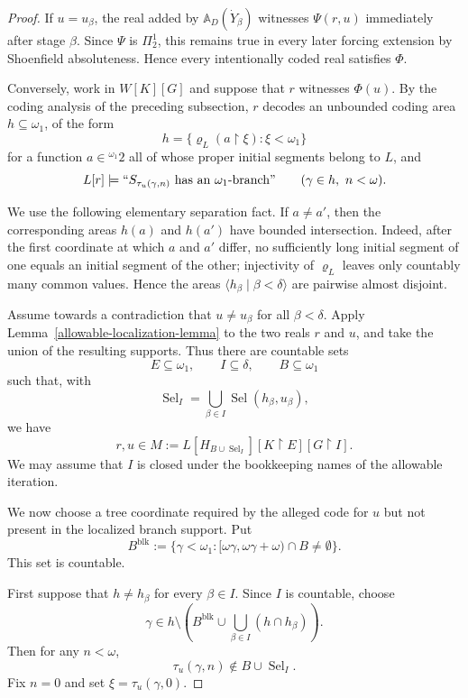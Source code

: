 \documentclass[a4paper,11pt]{article}
\begin{document}
\begin{proof}
If $u=u_\beta$, the real added by $\mathbb A_D(\dot Y_\beta)$ witnesses
$\Psi(r,u)$ immediately after stage $\beta$.  Since $\Psi$ is $\Pi^1_2$, this
remains true in every later forcing extension by Shoenfield absoluteness.
Hence every intentionally coded real satisfies $\Phi$.

Conversely, work in $W[K][G]$ and suppose that $r$ witnesses $\Phi(u)$.  By
the coding analysis of the preceding subsection, $r$ decodes an unbounded
coding area $h\subseteq\omega_1$, of the form
\[
   h=\{\varrho_L(a\restriction\xi):\xi<\omega_1\}
\]
for a function $a\in{}^{\omega_1}2$ all of whose proper initial segments
belong to $L$, and
\[
   L[r]\models
   ``S_{\tau_u(\gamma,n)}\text{ has an }\omega_1\text{-branch}"
   \qquad(\gamma\in h,\ n<\omega).
\]

We use the following elementary separation fact.  If $a\neq a'$, then the
corresponding areas $h(a)$ and $h(a')$ have bounded intersection.  Indeed,
after the first coordinate at which $a$ and $a'$ differ, no sufficiently long
initial segment of one equals an initial segment of the other; injectivity of
$\varrho_L$ leaves only countably many common values.  Hence the areas
$\langle h_\beta\mid\beta<\delta\rangle$ are pairwise almost disjoint.

Assume towards a contradiction that $u\neq u_\beta$ for all $\beta<\delta$.
Apply Lemma~\ref{allowable-localization-lemma} to the two reals $r$ and $u$,
and take the union of the resulting supports.  Thus there are countable sets
\[
   E\subseteq\omega_1,
   \qquad I\subseteq\delta,
   \qquad B\subseteq\omega_1
\]
such that, with
\[
   \operatorname{Sel}_I=
      \bigcup_{\beta\in I}\operatorname{Sel}(h_\beta,u_\beta),
\]
we have
\[
   r,u\in
   M:=L[H_{B\cup\operatorname{Sel}_I}]
      [K\upharpoonright E]
      [G\upharpoonright I].
\]
We may assume that $I$ is closed under the bookkeeping names of the allowable
iteration.

We now choose a tree coordinate required by the alleged code for $u$ but not
present in the localized branch support.  Put
\[
   B^{\mathrm{blk}}
   :=\{\gamma<\omega_1:
       [\omega\gamma,\omega\gamma+\omega)\cap B\neq\emptyset\}.
\]
This set is countable.

First suppose that $h\neq h_\beta$ for every $\beta\in I$.  Since $I$ is
countable, choose
\[
   \gamma\in h\setminus
      \left(B^{\mathrm{blk}}\cup
      \bigcup_{\beta\in I}(h\cap h_\beta)\right).
\]
Then for any $n<\omega$,
\[
   \tau_u(\gamma,n)\notin
   B\cup\operatorname{Sel}_I.
\]
Fix $n=0$ and set $\xi=\tau_u(\gamma,0)$.


\end{proof}
\end{document}
